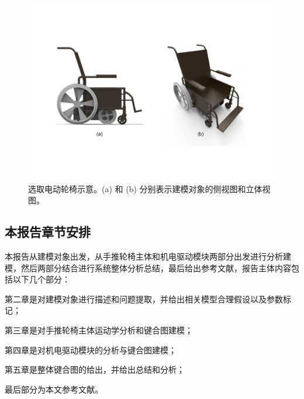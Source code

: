 \begin{figure}[!h]
	\centering
	\includegraphics[width=1\textwidth]{fig/PW_rendering.pdf}
	\caption{选取电动轮椅示意。(a) 和 (b) 分别表示建模对象的侧视图和立体视图。}\label{fig:PW_rendering}
\end{figure}

\subsection{本报告章节安排}

本报告从建模对象出发，从手推轮椅主体和机电驱动模块两部分出发进行分析建模，然后两部分结合进行系统整体分析总结，最后给出参考文献，报告主体内容包括以下几个部分：

第二章是对建模对象进行描述和问题提取，并给出相关模型合理假设以及参数标记；

第三章是对手推轮椅主体运动学分析和键合图建模；

第四章是对机电驱动模块的分析与键合图建模；

第五章是整体键合图的给出，并给出总结和分析；

最后部分为本文参考文献。